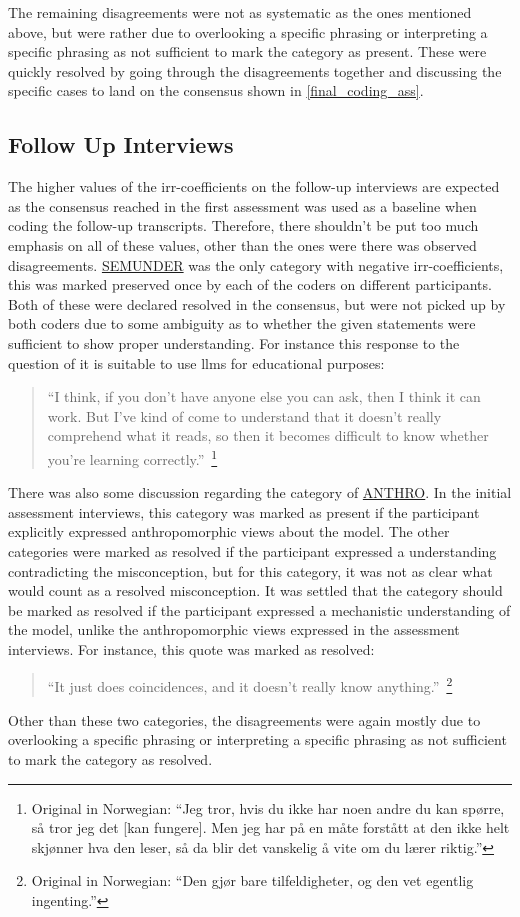 The remaining disagreements were not as systematic as the ones mentioned above, but were rather due to overlooking a specific phrasing or interpreting a specific phrasing as not sufficient to mark the category as present. These were quickly resolved by going through the disagreements together and discussing the specific cases to land on the consensus shown in \autoref{final_coding_ass}. 


\subsection*{Follow Up Interviews}
The higher values of the \gls{irr}-coefficients on the follow-up interviews are expected as the consensus reached in the first assessment was used as a baseline when coding the follow-up transcripts. Therefore, there shouldn't be put too much emphasis on all of these values, other than the ones were there was observed disagreements. 
\hyperref[semunder]{SEMUNDER} was the only category with negative \gls{irr}-coefficients, this was marked preserved once by each of the coders on different participants. Both of these were declared resolved in the consensus, but were not picked up by both coders due to some ambiguity as to whether the given statements were sufficient to show proper understanding. For instance this response to the question of it is suitable to use \gls{llms} for educational purposes:
\begin{quote}
``I think, if you don't have anyone else you can ask, then I think it can work. But I've kind of come to understand that it doesn't really comprehend what it reads, so then it becomes difficult to know whether you're learning correctly.''~\footnote{Original in Norwegian: ``Jeg tror, hvis du ikke har noen andre du kan spørre, så tror jeg det [kan fungere]. Men jeg har på en måte forstått at den ikke helt skjønner hva den leser, så da blir det vanskelig å vite om du lærer riktig.''}
\end{quote}

There was also some discussion regarding the category of \hyperref[anthro]{ANTHRO}. In the initial assessment interviews, this category was marked as present if the participant explicitly expressed anthropomorphic views about the model. The other categories were marked as resolved if the participant expressed a understanding contradicting the misconception, but for this category, it was not as clear what would count as a resolved misconception. It was settled that the category should be marked as resolved if the participant expressed a mechanistic understanding of the model, unlike the anthropomorphic views expressed in the assessment interviews. For instance, this quote was marked as resolved:
\begin{quote}
``It just does coincidences, and it doesn't really know anything.''~\footnote{Original in Norwegian: ``Den gjør bare tilfeldigheter, og den vet egentlig ingenting.''}
\end{quote}
Other than these two categories, the disagreements were again mostly due to overlooking a specific phrasing or interpreting a specific phrasing as not sufficient to mark the category as resolved. 


